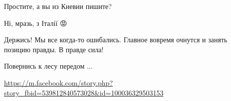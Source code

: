 \begin{itemize}
\begin{itemize}
 
Простите, а вы из Киевии пишите?

 
Ні, мразь, з Італії
😡
\end{itemize}

 
Держись! Мы все когда-то ошибались. Главное вовремя очнутся и занять позицию правды. В правде сила!

\begin{itemize}
 
Повернись к лесу передом ...
\end{itemize}

 
\url{https://m.facebook.com/story.php?story_fbid=539812840573028&id=100036329503153}

 


\end{itemize}
